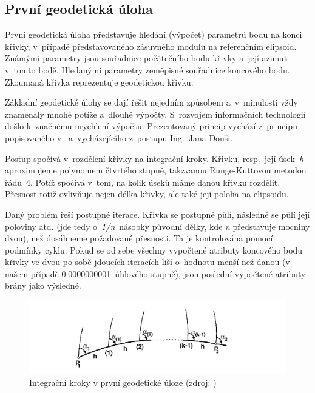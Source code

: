 \subsection{První geodetická úloha}
\label{prvnigu}

První geodetická úloha představuje hledání (výpočet) parametrů bodu na konci křivky, v~případě
představovaného zásuvného modulu na referenčním elipsoid. Zná\-mými parametry jsou souřadnice počátečního
bodu křivky a~její azimut v~tomto bodě. Hledanými parametry zeměpisné souřadnice koncového bodu.
Zkoumaná křivka reprezentuje geodetickou křivku. 

Základní geodetické úlohy se dají řešit nejedním způsobem a~v~minulosti vždy znamenaly mnohé potíže
a~dlouhé výpočty. S~rozvojem informačních technologií došlo k~značnému urychlení výpočtu.
Prezentovaný princip vychází z~principu popisovaného v~\cite{vyssigeodezie} a~vycházejícího
z~postupu Ing.~Jana Douši. 

Postup spočívá v~rozdělení křivky na integrační kroky. Křivku, resp.~její úsek~\textit{h}
aproximujeme polynomem čtvrtého stupně, takzvanou Runge-Kuttovou metodou řádu~4. Potíž spočívá v~tom,
na kolik úseků máme danou křivku rozdělit. Přesnost totiž ovlivňuje nejen délka křivky, ale také její
poloha na elipsoidu. 

Daný problém řeší postupné iterace. Křivka se postupně půlí, následně se půlí její poloviny atd. (jde
tedy o~\textit{1/n}~násobky původní délky, kde \textit{n} představuje mocniny dvou), než dosáhneme
požadované přesnosti. Ta je kontrolována pomocí podmínky cyklu: Pokud se od sebe všechny vypočtené
atributy koncového bodu křivky ve dvou po sobě jdoucích iteracích liší o~hodnotu menší než danou
(v našem případě 0.0000000001~úhlového stupně), jsou poslední vypočtené atributy brány jako výsledné. 


  \begin{figure}[H]
   \centering
	\includegraphics[scale=0.5]{./pictures/prvnigu-integrace.png}
	\caption[Integrační kroky v první geodetické úloze]{Integrační kroky v první geodetické úloze
	(zdroj: \cite{vyssigeodezie})}
      \label{fig:prvnigu-integrace}
  \end{figure}





